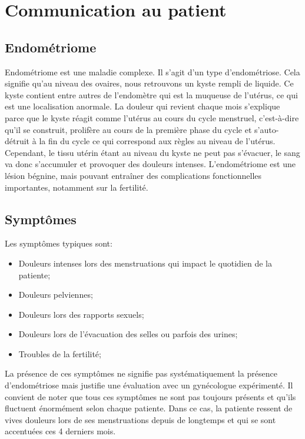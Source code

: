 \section{Communication au patient}

\subsection{Endométriome}
Endométriome est une maladie complexe. Il s’agit d’un type d’endométriose. Cela signifie qu’au niveau des ovaires, nous retrouvons un kyste rempli de liquide. Ce kyste contient entre autres de l’endomètre qui est la muqueuse de l’utérus, ce qui est une localisation anormale. La douleur qui revient chaque mois s’explique parce que le kyste réagit comme l’utérus au cours du cycle menstruel, c’est-à-dire qu’il se construit, prolifère au cours de la première phase du cycle et s’auto-détruit à la fin du cycle ce qui correspond aux règles au niveau de l’utérus. Cependant, le tissu utérin étant au niveau du kyste ne peut pas s’évacuer, le sang va donc s’accumuler et provoquer des douleurs intenses. L’endométriome est une lésion bégnine, mais pouvant entraîner des complications fonctionnelles importantes, notamment sur la fertilité.

\subsection{Symptômes}

Les symptômes typiques sont:

\begin{itemize}[compact, label=\textbullet]
    \item Douleurs intenses lors des menstruations qui impact le quotidien de la patiente;
    \item Douleurs pelviennes;
    \item Douleurs lors des rapports sexuels;
    \item Douleurs lors de l’évacuation des selles ou parfois des urines;
    \item Troubles de la fertilité;
\end{itemize}

La présence de ces symptômes ne signifie pas systématiquement la présence d’endométriose mais justifie une évaluation avec un gynécologue expérimenté. Il convient de noter que tous ces symptômes ne sont pas toujours présents et qu’ils fluctuent énormément selon chaque patiente. Dans ce cas, la patiente ressent de vives douleurs lors de ses menstruations depuis de longtemps et qui se sont accentuées ces 4 derniers mois.

